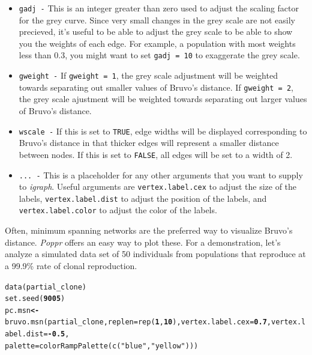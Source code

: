 \documentclass[letterpaper]{article}\usepackage[]{graphicx}\usepackage[]{color}
\makeatletter
\newcommand{\hlnum}[1]{\textcolor[rgb]{0.502,0,0.502}{\textbf{#1}}}%
\newcommand{\hlstr}[1]{\textcolor[rgb]{0.651,0.522,0}{#1}}%
\newcommand{\hlopt}[1]{\textcolor[rgb]{1,0,0.502}{\textbf{#1}}}%
\newcommand{\hlstd}[1]{\textcolor[rgb]{0,0,0}{#1}}%
\newcommand{\hlkwb}[1]{\textcolor[rgb]{0.502,0.502,0.753}{\textbf{#1}}}%
\newcommand{\hlkwc}[1]{\textcolor[rgb]{0,0.502,0.753}{#1}}%
\newcommand{\hlkwd}[1]{\textcolor[rgb]{0,0.267,0.4}{#1}}%
\newenvironment{kframe}{%
 \def\at@end@of@kframe{}%
 \ifinner\ifhmode%
  \def\at@end@of@kframe{\end{minipage}}%
  \begin{minipage}{\columnwidth}%
 \fi\fi%
 \def\FrameCommand##1{\hskip\@totalleftmargin \hskip-\fboxsep
 \colorbox{shadecolor}{##1}\hskip-\fboxsep
     \hskip-\linewidth \hskip-\@totalleftmargin \hskip\columnwidth}%
 \MakeFramed {\advance\hsize-\width
   \@totalleftmargin\z@ \linewidth\hsize
   \@setminipage}}%
 {\par\unskip\endMakeFramed%
 \at@end@of@kframe}
\newenvironment{knitrout}{}{} %
\newcommand{\Poppr}{\textit{Poppr}}
\makeatother
\begin{document}
\begin{itemize}
  \item \texttt{gadj -} This is an integer greater than zero used to adjust the scaling factor for the grey curve. Since very small changes in the grey scale are not easily precieved, it's useful to be able to adjust the grey scale to be able to show you the weights of each edge. For example, a population with most weights less than 0.3, you might want to set \texttt{gadj = 10} to exaggerate the grey scale. 
  \item \texttt{gweight -} If \texttt{gweight = 1}, the grey scale adjustment will be weighted towards separating out smaller values of Bruvo's distance. If \texttt{gweight = 2}, the grey scale ajustment will be weighted towards separating out larger values of Bruvo's distance.
  \item \texttt{wscale -} If this is set to \texttt{TRUE}, edge widths will be displayed corresponding to Bruvo's distance in that thicker edges will represent a smaller distance between nodes. If this is set to \texttt{FALSE}, all edges will be set to a width of 2. 
  \item \texttt{... -} This is a placeholder for any other arguments that you want to supply to \textit{igraph}. Useful arguments are \texttt{vertex.label.cex} to adjust the size of the labels, \texttt{vertex.label.dist} to adjust the position of the labels, and \texttt{vertex.label.color} to adjust the color of the labels.
\end{itemize}

Often, minimum spanning networks are the preferred way to visualize Bruvo's distance. \Poppr{} offers an easy way to plot these. For a demonstration, let's analyze a simulated data set of 50 individuals from populations that reproduce at a 99.9\% rate of clonal reproduction.

\begin{knitrout}\footnotesize
{}\color{fgcolor}\begin{kframe}
\begin{alltt}
\hlkwd{data}\hlstd{(partial_clone)}
\hlkwd{set.seed}\hlstd{(}\hlnum{9005}\hlstd{)}
\hlstd{pc.msn} \hlkwb{<-} \hlkwd{bruvo.msn}\hlstd{(partial_clone,} \hlkwc{replen} \hlstd{=} \hlkwd{rep}\hlstd{(}\hlnum{1}\hlstd{,} \hlnum{10}\hlstd{),} \hlkwc{vertex.label.cex} \hlstd{=} \hlnum{0.7}\hlstd{,} \hlkwc{vertex.label.dist} \hlstd{=} \hlopt{-}\hlnum{0.5}\hlstd{,}
    \hlkwc{palette} \hlstd{=} \hlkwd{colorRampPalette}\hlstd{(}\hlkwd{c}\hlstd{(}\hlstr{"blue"}\hlstd{,} \hlstr{"yellow"}\hlstd{)))}
\end{alltt}
\end{kframe}
\end{knitrout}
\end{document}
